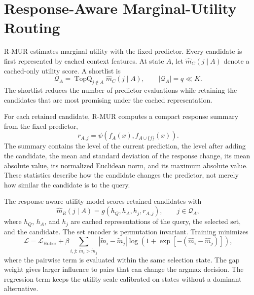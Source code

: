 \section{Response-Aware Marginal-Utility Routing}

R-MUR estimates marginal utility with the fixed predictor. Every candidate is
first represented by cached context features. At state $A$, let
$\widehat m_C(j\mid A)$ denote a cached-only utility score. A shortlist is
\begin{equation}
 \mathcal Q_A=\operatorname{TopQ}_{j\notin A}\widehat m_C(j\mid A),
 \qquad |\mathcal Q_A|=q\ll K.
\end{equation}
The shortlist reduces the number of predictor evaluations while retaining the
candidates that are most promising under the cached representation.

For each retained candidate, R-MUR computes a compact response summary from
the fixed predictor,
\begin{equation}
 r_{A,j}
 =
 \psi\!\left(f_A(x),f_{A\cup\{j\}}(x)\right).
 \label{eq:response}
\end{equation}
The summary contains the level of the current prediction, the level after
adding the candidate, the mean and standard deviation of the response change,
its mean absolute value, its normalized Euclidean norm, and its maximum
absolute value. These statistics describe how the candidate changes the
predictor, not merely how similar the candidate is to the query.

The response-aware utility model scores retained candidates with
\begin{equation}
 \widehat m_R(j\mid A)
 =
 g(h_Q,h_A,h_j,r_{A,j}),
 \qquad j\in\mathcal Q_A,
 \label{eq:rmur}
\end{equation}
where $h_Q$, $h_A$, and $h_j$ are cached representations of the query, the
selected set, and the candidate. The set encoder is permutation invariant.
Training minimizes
\begin{equation}
 \mathcal L
 =
 \mathcal L_{\mathrm{Huber}}
 +
 \beta
 \sum_{i,j:\,\widetilde m_i>\widetilde m_j}
 |\widetilde m_i-\widetilde m_j|
 \log\!\left(
 1+\exp\!\left[-(\widehat m_i-\widehat m_j)\right]
 \right),
 \label{eq:loss}
\end{equation}
where the pairwise term is evaluated within the same selection state. The gap
weight gives larger influence to pairs that can change the argmax decision.
The regression term keeps the utility scale calibrated on states without a
dominant alternative.

